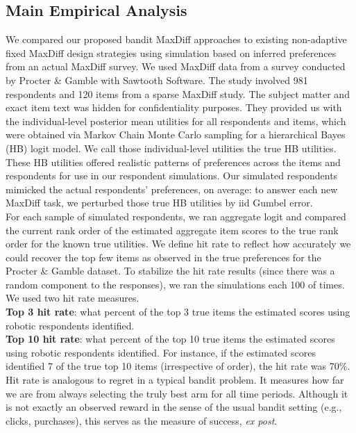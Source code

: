 \documentclass[mksc,blindrev]{informs3} %
\begin{document}
\subsection{Main Empirical Analysis}
We compared our proposed bandit MaxDiff approaches to existing non-adaptive fixed MaxDiff design strategies using simulation based on inferred preferences from an actual MaxDiff survey. We used MaxDiff data from a survey conducted by Procter \& Gamble with Sawtooth Software. The study involved 981 respondents and 120 items from a sparse MaxDiff study. The subject matter and exact item text was hidden for confidentiality purposes. They provided us with the individual-level posterior mean utilities for all respondents and items, which were obtained via Markov Chain Monte Carlo sampling for a hierarchical Bayes (HB) logit model. We call those individual-level utilities the true HB utilities.  These HB utilities offered realistic patterns of preferences across the items and respondents for use in our respondent simulations.  Our simulated respondents mimicked the actual respondents’ preferences, on average: to answer each new MaxDiff task, we perturbed those true HB utilities by iid Gumbel error.  \\
For each sample of simulated respondents, we ran aggregate logit and compared the current rank order of the estimated aggregate item scores to the true rank order for the known true utilities.  We define hit rate to reflect how accurately we could recover the top few items as observed in the true preferences for the Procter \& Gamble dataset.  To stabilize the hit rate results (since there was a random component to the responses), we ran the simulations each 100 of times. \\
We used two hit rate measures.\\ \textbf{Top 3 hit rate}: what percent of the top 3 true items the estimated scores using robotic respondents identified.\\ \textbf{Top 10 hit rate}: what percent of the top 10 true items the estimated scores using robotic respondents identified.  For instance, if the estimated scores identified 7 of the true top 10 items (irrespective of order), the hit rate was 70\%.\\
Hit rate is analogous to regret in a typical bandit problem. It measures how far we are from always selecting the truly best arm for all time periods. Although it is not exactly an observed reward in the sense of the usual bandit setting (e.g., clicks, purchases), this serves as the measure of success, \textit{ex post}.\\
\end{document}

